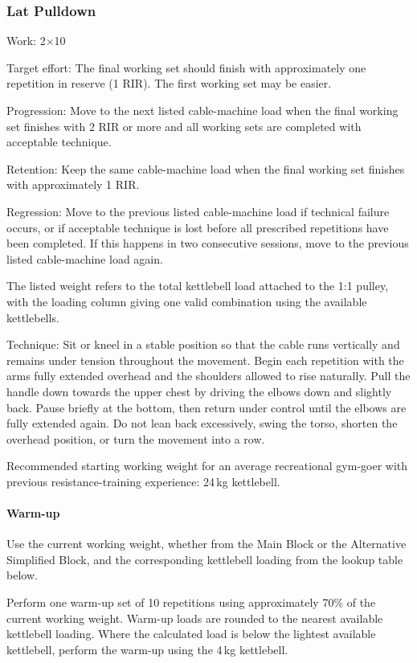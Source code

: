 \documentclass[11pt,a4paper]{article}
\begin{document}
\newpage
\subsubsection{Lat Pulldown}

Work: 2$\times$10

Target effort: The final working set should finish with approximately one repetition in reserve (1 RIR). The first working set may be easier.

Progression: Move to the next listed cable-machine load when the final working set finishes with 2 RIR or more and all working sets are completed with acceptable technique.

Retention: Keep the same cable-machine load when the final working set finishes with approximately 1 RIR.

Regression: Move to the previous listed cable-machine load if technical failure occurs, or if acceptable technique is lost before all prescribed repetitions have been completed. If this happens in two consecutive sessions, move to the previous listed cable-machine load again.

The listed weight refers to the total kettlebell load attached to the 1:1 pulley, with the loading column giving one valid combination using the available kettlebells.

Technique: Sit or kneel in a stable position so that the cable runs vertically and remains under tension throughout the movement. Begin each repetition with the arms fully extended overhead and the shoulders allowed to rise naturally. Pull the handle down towards the upper chest by driving the elbows down and slightly back. Pause briefly at the bottom, then return under control until the elbows are fully extended again. Do not lean back excessively, swing the torso, shorten the overhead position, or turn the movement into a row.

Recommended starting working weight for an average recreational gym-goer with previous resistance-training experience: 24\,kg kettlebell.

\paragraph{Warm-up}

Use the current working weight, whether from the Main Block or the Alternative Simplified Block, and the corresponding kettlebell loading from the lookup table below.

Perform one warm-up set of 10 repetitions using approximately 70\% of the current working weight. Warm-up loads are rounded to the nearest available kettlebell loading. Where the calculated load is below the lightest available kettlebell, perform the warm-up using the 4\,kg kettlebell.
\end{document}
